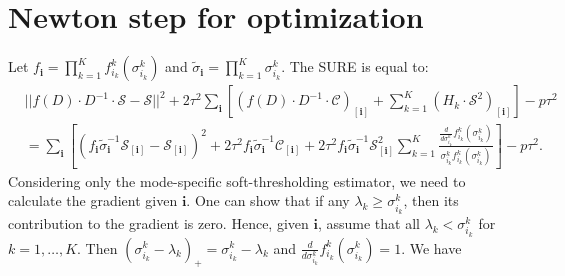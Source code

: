 \section{Newton step for optimization}
Let $f_{\mathbf{i}} = \prod_{k=1}^Kf_{i_k}^k(\sigma_{i_k}^k)$ and
$\tilde{\sigma}_{\mathbf{i}} = \prod_{k=1}^K\sigma_{i_k}^k$. The SURE
is equal to:
\begin{align}
  &||f(D) \cdot D ^{-1} \cdot \mathcal{S} - \mathcal{S}||^2 + 2\tau^2 \sum_{\mathbf{i}} \left[\left(f(D) \cdot D^{-1} \cdot \mathcal{C}\right)_{[\mathbf{i}]} + \sum_{k=1}^K \left(H_k \cdot \mathcal{S}^2\right)_{[\mathbf{i}]}\right] - p \tau^2\\
  & = \sum_{\mathbf{i}}\left[\left(f_{\mathbf{i}}\tilde{\sigma}^{-1}_{\mathbf{i}}\mathcal{S}_{[\mathbf{i}]} - \mathcal{S}_{[\mathbf{i}]}\right)^2 + 2\tau^2f_{\mathbf{i}}\tilde{\sigma}^{-1}_{\mathbf{i}}\mathcal{C}_{[\mathbf{i}]} + 2\tau^2f_{\mathbf{i}}\tilde{\sigma}^{-1}_{\mathbf{i}}\mathcal{S}_{[\mathbf{i}]}^2 \sum_{k=1}^K\frac{\frac{d}{d\sigma_{i_k}^k}f_{i_k}^k(\sigma_{i_k}^k)}{\sigma_{i_k}^kf_{i_k}^k(\sigma_{i_k}^k)}\right] - p\tau^2. \label{equation:sum.sure}
\end{align}
Considering only the mode-specific soft-thresholding estimator, we
need to calculate the gradient given $\mathbf{i}$. One can show that
if any $\lambda_k \geq \sigma_{i_k}^k$, then its contribution to the
gradient is zero. Hence, given $\mathbf{i}$, assume that all
$\lambda_k < \sigma_{i_k}^k$ for $k = 1,\ldots,K$. Then
$(\sigma_{i_k}^k - \lambda_k)_+ = \sigma_{i_k}^k - \lambda_k$ and
$\frac{d}{d\sigma_{i_k}^k}f_{i_k}^k(\sigma_{i_k}^k) = 1$. We have
